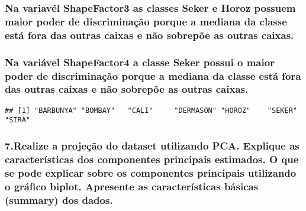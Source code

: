 \documentclass[
]{article}
\newenvironment{Shaded}{\begin{snugshade}}{\end{snugshade}}
\newcommand{\FunctionTok}[1]{\textcolor[rgb]{0.00,0.00,0.00}{#1}}
\newcommand{\NormalTok}[1]{#1}
\newcommand{\SpecialCharTok}[1]{\textcolor[rgb]{0.00,0.00,0.00}{#1}}
\begin{document}
\hypertarget{na-variavuxe9l-shapefactor3-as-classes-seker-e-horoz-possuem-maior-poder-de-discriminauxe7uxe3o-porque-a-mediana-da-classe-estuxe1-fora-das-outras-caixas-e-nuxe3o-sobrepuxf5e-as-outras-caixas.}{%
\subsubsection{Na variavél ShapeFactor3 as classes Seker e Horoz possuem
maior poder de discriminação porque a mediana da classe está fora das
outras caixas e não sobrepõe as outras
caixas.}\label{na-variavuxe9l-shapefactor3-as-classes-seker-e-horoz-possuem-maior-poder-de-discriminauxe7uxe3o-porque-a-mediana-da-classe-estuxe1-fora-das-outras-caixas-e-nuxe3o-sobrepuxf5e-as-outras-caixas.}}

\hypertarget{na-variuxe1vel-shapefactor4-a-classe-seker-possui-o-maior-poder-de-discriminauxe7uxe3o-porque-a-mediana-da-classe-estuxe1-fora-das-outras-caixas-e-nuxe3o-sobrepuxf5e-as-outras-caixas.}{%
\subsubsection{Na variável ShapeFactor4 a classe Seker possui o maior
poder de discriminação porque a mediana da classe está fora das outras
caixas e não sobrepõe as outras
caixas.}\label{na-variuxe1vel-shapefactor4-a-classe-seker-possui-o-maior-poder-de-discriminauxe7uxe3o-porque-a-mediana-da-classe-estuxe1-fora-das-outras-caixas-e-nuxe3o-sobrepuxf5e-as-outras-caixas.}}

\begin{Shaded}
\end{Shaded}

\begin{verbatim}
## [1] "BARBUNYA" "BOMBAY"   "CALI"     "DERMASON" "HOROZ"    "SEKER"    "SIRA"
\end{verbatim}

\hypertarget{realize-a-projeuxe7uxe3o-do-dataset-utilizando-pca.-explique-as-caracteruxedsticas-dos-componentes-principais-estimados.-o-que-se-pode-explicar-sobre-os-componentes-principais-utilizando-o-gruxe1fico-biplot.-apresente-as-caracteruxedsticas-buxe1sicas-summary-dos-dados.}{%
\subsubsection{7.Realize a projeção do dataset utilizando PCA. Explique
as características dos componentes principais estimados. O que se pode
explicar sobre os componentes principais utilizando o gráfico biplot.
Apresente as características básicas (summary) dos
dados.}\label{realize-a-projeuxe7uxe3o-do-dataset-utilizando-pca.-explique-as-caracteruxedsticas-dos-componentes-principais-estimados.-o-que-se-pode-explicar-sobre-os-componentes-principais-utilizando-o-gruxe1fico-biplot.-apresente-as-caracteruxedsticas-buxe1sicas-summary-dos-dados.}}
\end{document}
